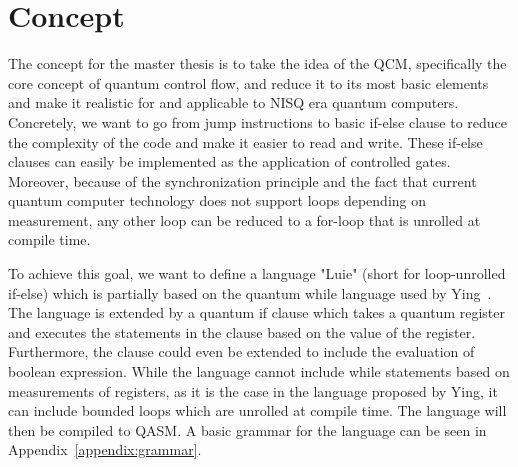 \chapter{Concept}

The concept for the master thesis is to take the idea of the QCM, specifically the core concept of quantum control flow, and reduce it to its most basic elements and make it realistic for and applicable to NISQ era quantum computers. Concretely, we want to go from jump instructions to basic if-else clause to reduce the complexity of the code and make it easier to read and write. These if-else clauses can easily be implemented as the application of controlled gates. Moreover, because of the synchronization principle and the fact that current quantum computer technology does not support loops depending on measurement, any other loop can be reduced to a for-loop that is unrolled at compile time.

To achieve this goal, we want to define a language "Luie" (short for loop-unrolled if-else) which is partially based on the quantum while language used by Ying~\cite{Ying11}. The language is extended by a quantum if clause which takes a quantum register and executes the statements in the clause based on the value of the register. Furthermore, the clause could even be extended to include the evaluation of boolean expression. While the language cannot include while statements based on measurements of registers, as it is the case in the language proposed by Ying, it can include bounded loops which are unrolled at compile time. The language will then be compiled to QASM. A basic grammar for the language can be seen in Appendix~\ref{appendix:grammar}.



